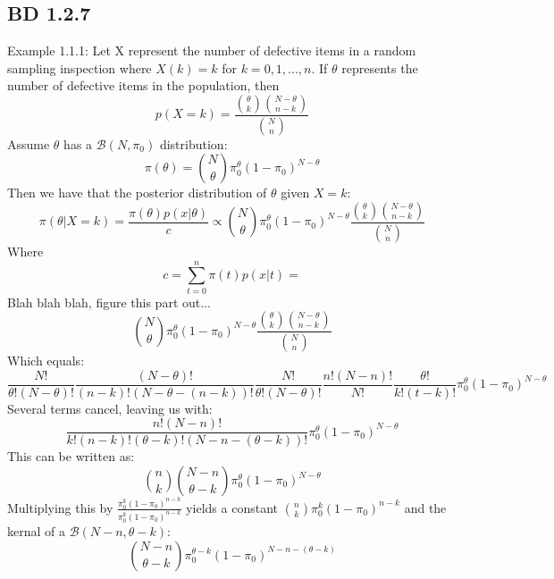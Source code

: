 \documentclass[a4paper,12pt]{article}
\begin{document}
\subsection{BD 1.2.7}
Example 1.1.1: Let X represent the number of defective items in a random sampling inspection where $X(k)=k$ for $k=0,1,...,n$. If $\theta$ represents the number of defective items in the population, then $$p(X=k)=\frac{{\theta\choose k}{N-\theta\choose n-k}}{{N\choose n}}$$ Assume $\theta$ has a $\mathcal{B}(N,\pi_0)$ distribution: $$\pi(\theta)={N\choose\theta}\pi_0^\theta(1-\pi_0)^{N-\theta}$$
Then we have that the posterior distribution of $\theta$ given $X=k$: $$\pi(\theta|X=k)=\frac{\pi(\theta)p(x|\theta)}{c}\propto{N\choose\theta}\pi_0^\theta(1-\pi_0)^{N-\theta}\frac{{\theta\choose k}{N-\theta\choose n-k}}{{N\choose n}}$$
Where $$c=\sum_{t=0}^n\pi(t)p(x|t)=$$
Blah blah blah, figure this part out...
$${N\choose\theta}\pi_0^\theta(1-\pi_0)^{N-\theta}\frac{{\theta\choose k}{N-\theta\choose n-k}}{{N\choose n}}$$
Which equals:$$\frac{N!}{\theta!(N-\theta)!}\frac{(N-\theta)!}{(n-k)!(N-\theta-(n-k))!}\frac{N!}{\theta!(N-\theta)!}\frac{n!(N-n)!}{N!}\frac{\theta!}{k!(t-k)!}\pi_0^{\theta}(1-\pi_0)^{N-\theta}$$
Several terms cancel, leaving us with:
$$\frac{n!(N-n)!}{k!(n-k)!(\theta-k)!(N-n-(\theta-k))!}\pi_0^\theta(1-\pi_0)^{N-\theta}$$
This can be written as:
$${n\choose k}{N-n\choose \theta-k}\pi_0^\theta(1-\pi_0)^{N-\theta}$$
Multiplying this by $\frac{\pi_0^k(1-\pi_0)^{n-k}}{\pi_0^k(1-\pi_0)^{n-k}}$ yields a constant ${n\choose k}\pi_0^k(1-\pi_0)^{n-k}$ and the kernal of a $\mathcal{B}(N-n,\theta-k)$:$${N-n\choose \theta-k}\pi_0^{\theta-k}(1-\pi_0)^{N-n-(\theta-k)}$$
\end{document}
